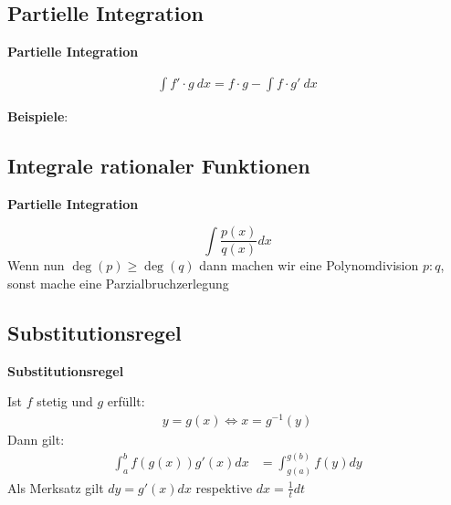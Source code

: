 \documentclass{sciposter}
\newenvironment{method}[1]{\begin{mdframed}[backgroundcolor=blue!10,innertopmargin=15pt, innerbottommargin=15pt, nobreak=true]
		\textbf{#1 }
	}
	{ 
	\end{mdframed}
}
\begin{document}
\begin{multicols}{2}
\subsection*{Partielle Integration}
\begin{method}{Partielle Integration}
	\begin{align*}
	\int f' \cdot g \ dx = f \cdot g - \int f \cdot g' \  dx
	\end{align*}
\end{method}
\textbf{Beispiele}:


\subsection*{Integrale rationaler Funktionen}
\begin{method}{Partielle Integration}
	$$\int \frac{p(x)}{q(x)} dx$$
	Wenn nun $\deg(p) \geq \deg(q)$ dann machen wir eine Polynomdivision $p:q$, sonst mache eine Parzialbruchzerlegung
\end{method}

\subsection*{Substitutionsregel}
\begin{method}{Substitutionsregel}
	Ist $f$ stetig und $g$ erfüllt:
	\begin{align*}
	y = g(x) \iff x = g^{-1}(y)
	\end{align*}
	Dann gilt:
	\begin{align*}
	\int_a ^b f(g(x))g'(x) dx &= \int_{g(a)}^{g(b)} f(y) dy
	\end{align*}
	Als Merksatz gilt $dy = g'(x) dx$ respektive $dx = \frac{1}{t} dt$
\end{method}


\vfill\null
\columnbreak



\end{multicols}
\end{document}
